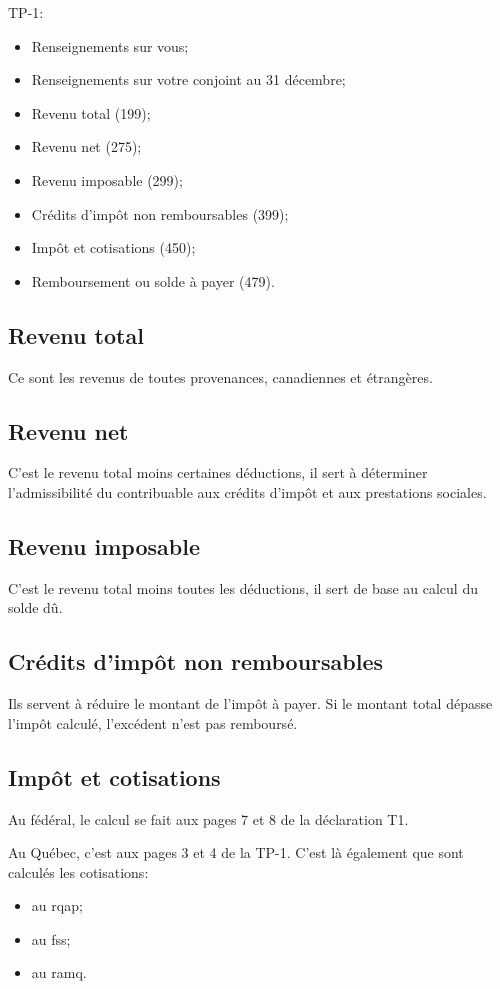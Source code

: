TP-1:
\qc
\begin{itemize}
	\item Renseignements sur vous;
	\item Renseignements sur votre conjoint au 31 décembre;
	\item Revenu total (199);
	\item Revenu net (275);
	\item Revenu imposable (299);
	\item Crédits d'impôt non remboursables (399);
	\item Impôt et cotisations (450);
	\item Remboursement ou solde à payer (479).
\end{itemize}


\subsection{Revenu total}
Ce sont les revenus de toutes provenances, canadiennes et étrangères.


\subsection{Revenu net}
C'est le revenu total moins certaines déductions, il sert à déterminer l'admissibilité du contribuable aux crédits d'impôt et aux prestations sociales.


\subsection{Revenu imposable}
C'est le revenu total moins toutes les déductions, il sert de base au calcul du solde dû.


\subsection{Crédits d'impôt non remboursables}
Ils servent à réduire le montant de l'impôt à payer. Si le montant total dépasse l'impôt calculé, l'excédent n'est pas remboursé.


\subsection{Impôt et cotisations}
Au fédéral, le calcul se fait aux pages 7 et 8 de la déclaration T1.

Au Québec, c'est aux pages 3 et 4 de la TP-1. C'est là également que sont calculés les cotisations:
\begin{itemize}
	\item au \acrfull{rqap};
	\item au \acrfull{fss};
	\item au \acrfull{ramq}.
\end{itemize}


